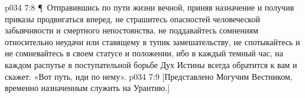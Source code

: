 \vs p034 7:8 \P\ Отправившись по пути жизни вечной, приняв назначение и получив приказы продвигаться вперед, не страшитесь опасностей человеческой забывчивости и смертного непостоянства, не поддавайтесь сомнениям относительно неудачи или ставящему в тупик замешательству, не спотыкайтесь и не сомневайтесь в своем статусе и положении, ибо в каждый темный час, на каждом распутье в поступательной борьбе Дух Истины всегда обратится к вам и скажет: «Вот путь, иди по нему».
\vs p034 7:9 [Представлено Могучим Вестником, временно назначенным служить на Урантию.]
